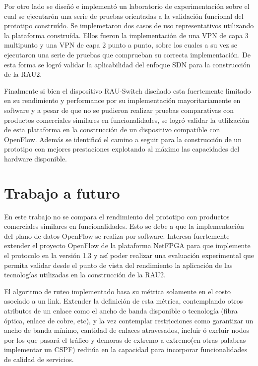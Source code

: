 Por otro lado se diseñ\'o e implement\'o un laboratorio de experimentaci\'on sobre el cual se ejecutar\'on una serie de pruebas orientadas a la validaci\'on funcional del prototipo constru\'ido. Se implemetaron dos casos de uso representativos utilizando la plataforma constru\'ida. Ellos fueron la implementaci\'on de una VPN de capa 3 multipunto y una VPN de capa 2 punto a punto, sobre los cuales a su vez se ejecutaron una serie de pruebas que comprueban su correcta implementaci\'on. De esta forma se logr\'o validar la aplicabilidad del enfoque SDN para la construcci\'on de la RAU2.

Finalmente si bien el dispositivo RAU-Switch diseñado esta fuertemente limitado en su rendimiento y performance por su implementaci\'on mayoritariamente en software y a pesar de que no se pudieron realizar pruebas comparativas con productos comerciales similares en funcionalidades, se logr\'o validar la utlilzaci\'on de esta plataforma en la construcci\'on de un dispositivo compatible con OpenFlow. Adem\'as se identific\'o el camino a seguir para la construcci\'on de un prototipo con mejores prestaciones explotando al m\'aximo las capacidades del hardware disponible.  

\section{Trabajo a futuro}
En este trabajo no se compara el rendimiento del prototipo con productos comerciales similares en funcionalidades. Esto se debe a que la implementaci\'on del plano de datos OpenFlow se realiza por software. Interesa fuertemente extender el proyecto OpenFlow de la plataforma NetFPGA para que implemente el protocolo en la versi\'on 1.3 y as\'i poder realizar una evaluaci\'on experimental que permita validar desde el punto de vista del rendimiento la aplicaci\'on de las tecnolog\'ias utilizadas en la construcci\'on de la RAU2.

El algoritmo de ruteo implementado basa su m\'etrica solamente en el costo asociado a un link. Extender  la definici\'on de esta m\'etrica, contemplando otros atributos de un enlace como el ancho de banda disponible o tecnolog\'ia (fibra \'optica, enlace de cobre, etc), y la vez contemplar restricciones como garantizar un ancho de banda m\'inimo, cantidad de enlaces atravesados, incluir \'o excluir nodos por los que pasar\'a el tr\'afico y demoras de extremo a extremo(en otras palabras implementar un CSPF) reditúa en la capacidad para incorporar funcionalidades de calidad de servicios.

